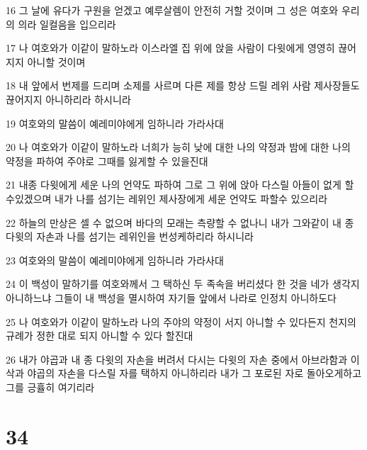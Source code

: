 \par 16 그 날에 유다가 구원을 얻겠고 예루살렘이 안전히 거할 것이며 그 성은 여호와 우리의 의라 일컬음을 입으리라
\par 17 나 여호와가 이같이 말하노라 이스라엘 집 위에 앉을 사람이 다윗에게 영영히 끊어지지 아니할 것이며
\par 18 내 앞에서 번제를 드리며 소제를 사르며 다른 제를 항상 드릴 레위 사람 제사장들도 끊어지지 아니하리라 하시니라
\par 19 여호와의 말씀이 예레미야에게 임하니라 가라사대
\par 20 나 여호와가 이같이 말하노라 너희가 능히 낮에 대한 나의 약정과 밤에 대한 나의 약정을 파하여 주야로 그때를 잃게할 수 있을진대
\par 21 내종 다윗에게 세운 나의 언약도 파하여 그로 그 위에 앉아 다스릴 아들이 없게 할 수있겠으며 내가 나를 섬기는 레위인 제사장에게 세운 언약도 파할수 있으리라
\par 22 하늘의 만상은 셀 수 없으며 바다의 모래는 측량할 수 없나니 내가 그와같이 내 종 다윗의 자손과 나를 섬기는 레위인을 번성케하리라 하시니라
\par 23 여호와의 말씀이 예레미야에게 임하니라 가라사대
\par 24 이 백성이 말하기를 여호와께서 그 택하신 두 족속을 버리셨다 한 것을 네가 생각지 아니하느냐 그들이 내 백성을 멸시하여 자기들 앞에서 나라로 인정치 아니하도다
\par 25 나 여호와가 이같이 말하노라 나의 주야의 약정이 서지 아니할 수 있다든지 천지의 규례가 정한 대로 되지 아니할 수 있다 할진대
\par 26 내가 야곱과 내 종 다윗의 자손을 버려서 다시는 다윗의 자손 중에서 아브라함과 이삭과 야곱의 자손을 다스릴 자를 택하지 아니하리라 내가 그 포로된 자로 돌아오게하고 그를 긍휼히 여기리라

\chapter{34}

